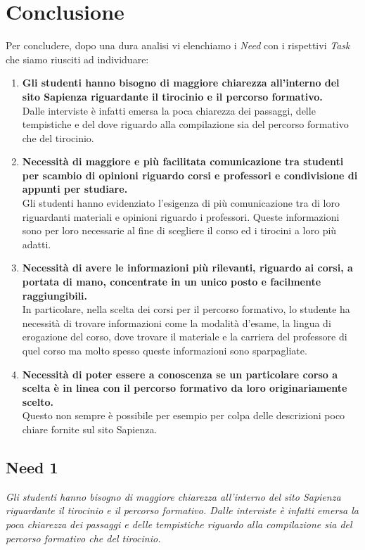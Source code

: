 \section{Conclusione}
Per concludere, dopo una dura analisi vi elenchiamo i \textit{Need} con i rispettivi \textit{Task} che siamo riusciti ad individuare:
\begin{enumerate}
    \item \textbf{Gli studenti hanno bisogno di maggiore chiarezza all'interno del sito Sapienza riguardante il tirocinio e il percorso formativo.}\\
     Dalle interviste è infatti emersa la poca chiarezza dei passaggi, delle tempistiche e del dove riguardo alla compilazione sia del percorso formativo che del tirocinio.
    \item \textbf{Necessità di maggiore e più facilitata comunicazione tra studenti per scambio di opinioni riguardo corsi e professori e condivisione di appunti per studiare.}\\
    Gli studenti hanno evidenziato l’esigenza di più comunicazione tra di loro riguardanti materiali e opinioni riguardo i professori. Queste informazioni sono per loro necessarie al fine di scegliere il corso ed i tirocini a loro più adatti.
    \item \textbf{Necessità di avere le informazioni più rilevanti, riguardo ai corsi, a portata di mano, concentrate in un unico posto e facilmente raggiungibili.}\\
    In particolare, nella scelta dei corsi per il percorso formativo, lo studente ha necessità di trovare informazioni come la modalità d’esame, la lingua di erogazione del corso, dove trovare il materiale e la carriera del professore di quel corso ma molto spesso queste informazioni sono sparpagliate.
    \item \textbf{Necessità di poter essere a conoscenza se un particolare corso a scelta è in linea con il percorso formativo da loro originariamente scelto.}\\
     Questo non sempre è possibile per esempio per colpa delle descrizioni poco chiare fornite sul sito Sapienza.
\end{enumerate}

\subsection{Need 1}
\begin{center}
    \textit{Gli studenti hanno bisogno di maggiore chiarezza all'interno del sito Sapienza riguardante il tirocinio e il percorso formativo. Dalle interviste è infatti emersa la poca chiarezza dei passaggi e delle tempistiche riguardo alla compilazione sia del percorso formativo che del tirocinio.}
\end{center}
